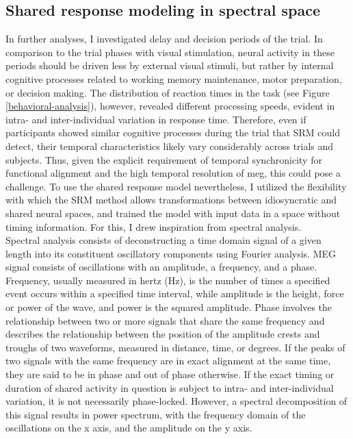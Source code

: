 \subsection{Shared response modeling in spectral space}

In further analyses, I investigated delay and decision periods of the trial.
In comparison to the trial phases with visual stimulation, neural activity in these periods should be driven less by external visual stimuli, but rather by internal cognitive processes related to working memory maintenance, motor preparation, or decision making.
The distribution of reaction times in the task (see Figure \ref{behavioral-analysis}), however, revealed different processing speeds, evident in intra- and inter-individual variation in response time.
Therefore, even if participants showed similar cognitive processes during the trial that \gls{SRM} could detect, their temporal characteristics likely vary considerably across trials and subjects.
Thus, given the explicit requirement of temporal synchronicity for functional alignment and the high temporal resolution of \gls{meg}, this could pose a challenge.
To use the shared response model nevertheless, I utilized the flexibility with which the \gls{SRM} method allows transformations between idiosyncratic and shared neural spaces, and trained the model with input data in a space without timing information.
For this, I drew inspiration from spectral analysis.\\
Spectral analysis consists of deconstructing a time domain signal of a given length into its constituent oscillatory components using Fourier analysis.
MEG signal consists of oscillations with an amplitude, a frequency, and a phase.
Frequency, usually measured in hertz (Hz), is the number of times a specified event occurs within a specified time interval, while amplitude is the height, force or power of the wave, and power is the squared amplitude.
Phase involves the relationship between two or more signals that share the same frequency and describes the relationship between the position of the amplitude crests and troughs of two waveforms, measured in distance, time, or degrees.
If the peaks of two signals with the same frequency are in exact alignment at the same time, they are said to be in phase and out of phase otherwise.
If the exact timing or duration of shared activity in question is subject to intra- and inter-individual variation, it is not necessarily phase-locked.
However, a spectral decomposition of this signal results in power spectrum, with the frequency domain of the oscillations on the x axis, and the amplitude on the y axis.

